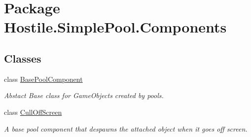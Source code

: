 \hypertarget{namespace_hostile_1_1_simple_pool_1_1_components}{\section{Package Hostile.\-Simple\-Pool.\-Components}
\label{namespace_hostile_1_1_simple_pool_1_1_components}
}
\subsection*{Classes}
\begin{DoxyCompactItemize}
\item 
class \hyperlink{class_hostile_1_1_simple_pool_1_1_components_1_1_base_pool_component}{Base\-Pool\-Component}
\begin{DoxyCompactList}\small\item\em Abstact Base class for Game\-Objects created by pools. \end{DoxyCompactList}\item 
class \hyperlink{class_hostile_1_1_simple_pool_1_1_components_1_1_cull_off_screen}{Cull\-Off\-Screen}
\begin{DoxyCompactList}\small\item\em A base pool component that despawns the attached object when it goes off screen. \end{DoxyCompactList}\end{DoxyCompactItemize}
